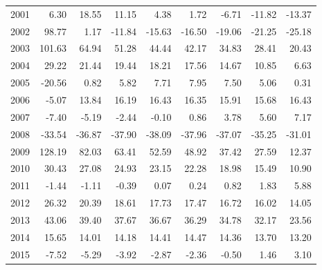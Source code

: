 \begin{table}[ht]
\begin{tabular}{rrrrrrrrr}
  2001 & 6.30 & 18.55 & 11.15 & 4.38 & 1.72 & -6.71 & -11.82 & -13.37 \\ 
  2002 & 98.77 & 1.17 & -11.84 & -15.63 & -16.50 & -19.06 & -21.25 & -25.18 \\ 
  2003 & 101.63 & 64.94 & 51.28 & 44.44 & 42.17 & 34.83 & 28.41 & 20.43 \\ 
  2004 & 29.22 & 21.44 & 19.44 & 18.21 & 17.56 & 14.67 & 10.85 & 6.63 \\ 
  2005 & -20.56 & 0.82 & 5.82 & 7.71 & 7.95 & 7.50 & 5.06 & 0.31 \\ 
  2006 & -5.07 & 13.84 & 16.19 & 16.43 & 16.35 & 15.91 & 15.68 & 16.43 \\ 
  2007 & -7.40 & -5.19 & -2.44 & -0.10 & 0.86 & 3.78 & 5.60 & 7.17 \\ 
  2008 & -33.54 & -36.87 & -37.90 & -38.09 & -37.96 & -37.07 & -35.25 & -31.01 \\ 
  2009 & 128.19 & 82.03 & 63.41 & 52.59 & 48.92 & 37.42 & 27.59 & 12.37 \\ 
  2010 & 30.43 & 27.08 & 24.93 & 23.15 & 22.28 & 18.98 & 15.49 & 10.90 \\ 
  2011 & -1.44 & -1.11 & -0.39 & 0.07 & 0.24 & 0.82 & 1.83 & 5.88 \\ 
  2012 & 26.32 & 20.39 & 18.61 & 17.73 & 17.47 & 16.72 & 16.02 & 14.05 \\ 
  2013 & 43.06 & 39.40 & 37.67 & 36.67 & 36.29 & 34.78 & 32.17 & 23.56 \\ 
  2014 & 15.65 & 14.01 & 14.18 & 14.41 & 14.47 & 14.36 & 13.70 & 13.20 \\ 
  2015 & -7.52 & -5.29 & -3.92 & -2.87 & -2.36 & -0.50 & 1.46 & 3.10 \\ 
   \hline
\end{tabular}
\end{table}

